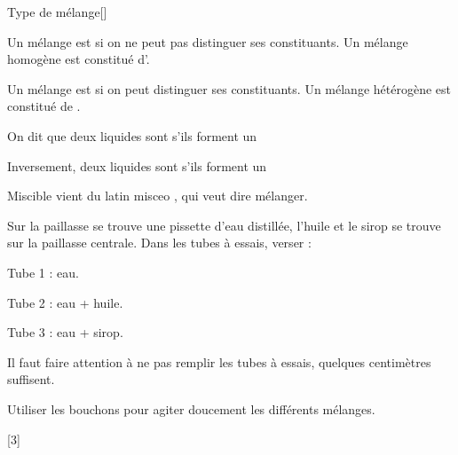 \begin{doc}{Type de mélange}[\label{doc:type_melange}]
  \begin{importants}
    Un mélange est  si on ne peut pas distinguer ses constituants.
    Un mélange homogène est constitué d'.
  \end{importants}
  
  \begin{importants}
    Un mélange est  si on peut distinguer ses constituants.
    Un mélange hétérogène est constitué de .
  \end{importants}

  \begin{importants}
    On dit que deux liquides sont  s'ils forment un 
  \end{importants}
  \begin{importants}
    Inversement, deux liquides sont  s'ils forment un 
  \end{importants}
  Miscible vient du latin \og misceo \fg, qui veut dire mélanger.
\end{doc}


\mesure
Sur la paillasse se trouve une pissette d'eau distillée, l'huile et le sirop se trouve sur la paillasse centrale.
Dans les tubes à essais, verser :
\begin{listePoints}[3]
  \item Tube 1 : eau.
  \item Tube 2 : eau + huile.
  \item Tube 3 : eau + sirop.
\end{listePoints}

\attention Il faut faire attention à ne pas remplir les tubes à essais, quelques centimètres suffisent.

\mesure 
Utiliser les bouchons pour agiter doucement les différents mélanges.

%
\newpage
\vspace*{-24pt}
\pasCorrection{\vspace*{6cm}}

%
[3]

